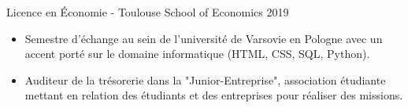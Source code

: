 Licence en Économie - Toulouse School of Economics
2019
\begin{itemize}
	\item Semestre d’échange au sein de l’université de Varsovie en Pologne avec un accent porté sur le domaine informatique (HTML, CSS, SQL, Python).
	\item Auditeur de la trésorerie dans la "Junior-Entreprise", association étudiante mettant en relation des étudiants et des entreprises pour réaliser des missions.
\end{itemize}